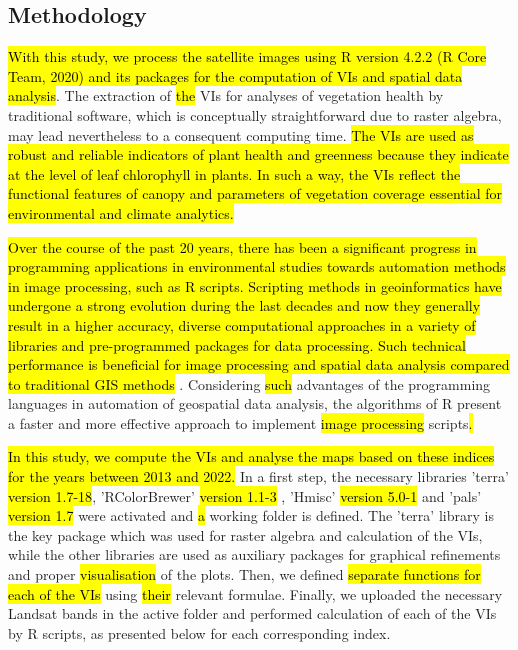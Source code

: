 \documentclass[jimaging,article,submit,pdftex,moreauthors]{Definitions/mdpi}
\begin{document}
\subsection{Methodology}

\hl{With this study, we process the satellite images using R version 4.2.2 (R Core Team, 2020) and its packages for the computation of VIs and spatial data analysis}\cite{RCoreTeam}. The extraction of \hl{the }VIs for analyses of vegetation health by traditional software, which is conceptually straightforward due to raster algebra, may lead nevertheless to a consequent computing time. \hl{The VIs are used as robust and reliable indicators of plant health and greenness because they indicate at the level of leaf chlorophyll in plants. In such a way, the VIs reflect the functional features of canopy and parameters of vegetation coverage essential for environmental and climate analytics. }

\hl{Over the course of the past 20 years, there has been a significant progress in programming applications in environmental studies towards automation methods in image processing, such as R scripts. Scripting methods in geoinformatics have undergone a strong evolution during the last decades and now they generally result in a higher accuracy, diverse computational approaches in a variety of libraries and pre-programmed packages for data processing. Such technical performance is beneficial for image processing and spatial data analysis compared to traditional GIS methods }\cite{6049966,Lemenkova202301,6910592,Lemenkova202228,9323708,1027236}. Considering \hl{such} advantages of the programming languages in automation of geospatial data analysis, the algorithms of R present a faster and more effective approach to implement \hl{image processing} scripts\hl{.} 

\hl{In this study, we compute the VIs and analyse the maps based on these indices for the years between 2013 and 2022. }In a first step, the necessary libraries 'terra' \hl{version 1.7-18}, 'RColorBrewer' \hl{version 1.1-3} \cite{Neuwirth}, 'Hmisc' \hl{version 5.0-1} \cite{Hmisc} and 'pals' \hl{version 1.7 }\cite{Wright} were activated and \hl{a} working folder is defined. The 'terra' library is the key package which was used for raster algebra and calculation of the VIs, while the other libraries are used as auxiliary packages for graphical refinements and proper \hl{visualisation} of the plots. Then, we defined \hl{separate functions for each of the VIs} using \hl{their }relevant formulae. Finally, we uploaded the necessary Landsat bands in the active folder and performed calculation of each of the VIs by R scripts, as presented below for each corresponding index.
\end{document}
